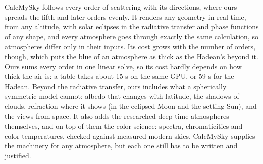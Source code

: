 \documentclass[9pt,twocolumn]{extarticle}
\begin{document}
CalcMySky follows every order of scattering with its directions, where ours spreads the fifth and later orders evenly. It renders any geometry in real time, from any altitude, with solar eclipses in the radiative transfer and phase functions of any shape, and every atmosphere goes through exactly the same calculation, so atmospheres differ only in their inputs. Its cost grows with the number of orders, though, which puts the blue of an atmosphere as thick as the Hadean's beyond it. Ours sums every order in one linear solve, so its cost hardly depends on how thick the air is: a table takes about 15 s on the same GPU, or 59 s for the Hadean. Beyond the radiative transfer, ours includes what a spherically symmetric model cannot: albedo that changes with latitude, the shadows of clouds, refraction where it shows (in the eclipsed Moon and the setting Sun), and the views from space. It also adds the researched deep-time atmospheres themselves, and on top of them the color science: spectra, chromaticities and color temperatures, checked against measured modern skies. CalcMySky supplies the machinery for any atmosphere, but each one still has to be written and justified.
\end{document}
